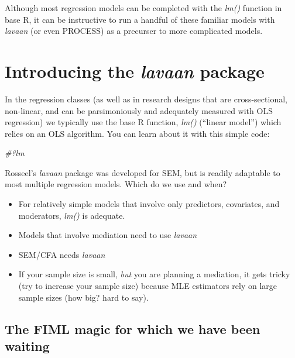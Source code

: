 \documentclass[
  11pt,
]{book}
\newenvironment{Shaded}{\begin{snugshade}}{\end{snugshade}}
\newcommand{\CommentTok}[1]{\textcolor[rgb]{0.37,0.37,0.37}{\textit{#1}}}
\providecommand{\tightlist}{%
  \setlength{\itemsep}{0pt}\setlength{\parskip}{0pt}}
\begin{document}
Although most regression models can be completed with the \emph{lm()} function in base R, it can be instructive to run a handful of these familiar models with \emph{lavaan} (or even PROCESS) as a precurser to more complicated models.

\hypertarget{introducing-the-lavaan-package}{%
\section{\texorpdfstring{Introducing the \emph{lavaan} package}{Introducing the lavaan package}}\label{introducing-the-lavaan-package}}

In the regression classes (as well as in research designs that are cross-sectional, non-linear, and can be parsimoniously and adequately measured with OLS regression) we typically use the base R function, \emph{lm()} (``linear model'') which relies on an OLS algorithm. You can learn about it with this simple code:

\begin{Shaded}
\begin{Highlighting}[]
\CommentTok{\#?lm}
\end{Highlighting}
\end{Shaded}

Rosseel's \citeyearpar{rosseel_lavaan_2020} \emph{lavaan} package was developed for SEM, but is readily adaptable to most multiple regression models. Which do we use and when?

\begin{itemize}
\tightlist
\item
  For relatively simple models that involve only predictors, covariates, and moderators, \emph{lm()} is adequate.
\item
  Models that involve mediation need to use \emph{lavaan}
\item
  SEM/CFA needs \emph{lavaan}
\item
  If your sample size is small, \emph{but} you are planning a mediation, it gets tricky (try to increase your sample size) because MLE estimators rely on large sample sizes (how big? hard to say).
\end{itemize}

\hypertarget{the-fiml-magic-for-which-we-have-been-waiting}{%
\subsection{The FIML magic for which we have been waiting}\label{the-fiml-magic-for-which-we-have-been-waiting}}
\end{document}
